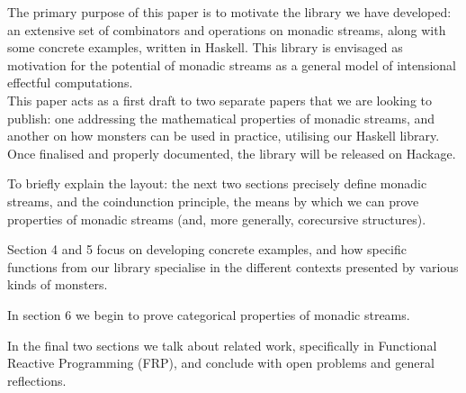 The primary purpose of this paper is to motivate the library we have developed: an extensive set of combinators and operations on monadic streams, along with some concrete examples, written in Haskell. This library is envisaged as motivation for the potential of monadic streams as a general model of intensional effectful computations. \\


This paper acts as a first draft to two separate papers that we are looking to publish: one addressing the mathematical properties of monadic streams, and another on how monsters can be used in practice, utilising our Haskell library. Once finalised and properly documented, the library will be released on Hackage.

To briefly explain the layout: the next two sections precisely define monadic streams, and the coindunction principle, the means by which we can prove properties of monadic streams (and, more generally, corecursive structures).

Section 4 and 5 focus on developing concrete examples, and how specific functions from our library specialise in the different contexts presented by various kinds of monsters. 

In section 6 we begin to prove categorical properties of monadic streams. 

In the final two sections we talk about related work, specifically in Functional Reactive Programming (FRP), and conclude with open problems and general reflections. \\

